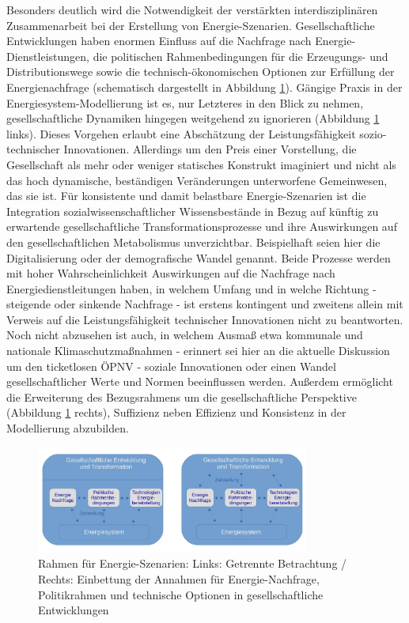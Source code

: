 \documentclass[a4paper,11pt,twoside]{scrartcl}
\begin{document}
Besonders deutlich wird die Notwendigkeit der verstärkten interdisziplinären Zusammenarbeit bei der Erstellung von Energie-Szenarien. Gesellschaftliche Entwicklungen haben enormen Einfluss auf die Nachfrage nach Energie-Dienstleistungen, die politischen Rahmenbedingungen für die Erzeugungs- und Distributionswege sowie die technisch-ökonomischen Optionen zur Erfüllung der Energienachfrage (schematisch dargestellt in Abbildung \ref{fig:szenarien}). Gängige Praxis in der Energiesystem-Modellierung ist es, nur Letzteres in den Blick zu nehmen, gesellschaftliche Dynamiken hingegen weitgehend zu ignorieren (Abbildung \ref{fig:szenarien} links). Dieses Vorgehen erlaubt eine Abschätzung der Leistungsfähigkeit sozio-technischer Innovationen. Allerdings um den Preis einer Vorstellung, die Gesellschaft als mehr oder weniger statisches Konstrukt imaginiert und nicht als das hoch dynamische, beständigen Veränderungen unterworfene Gemeinwesen, das sie ist. Für konsistente und damit belastbare Energie-Szenarien ist die Integration sozialwissenschaftlicher Wissensbestände in Bezug auf künftig zu erwartende gesellschaftliche Transformationsprozesse und ihre Auswirkungen auf den gesellschaftlichen Metabolismus unverzichtbar. Beispielhaft seien hier die Digitalisierung oder der demografische Wandel genannt. Beide Prozesse werden mit hoher Wahrscheinlichkeit Auswirkungen auf die Nachfrage nach Energiedienstleitungen haben, in welchem Umfang und in welche Richtung - steigende oder sinkende Nachfrage - ist erstens kontingent und zweitens allein mit Verweis auf die Leistungsfähigkeit technischer Innovationen nicht zu beantworten. Noch nicht abzusehen ist auch, in welchem Ausmaß etwa kommunale und nationale Klimaschutzmaßnahmen - erinnert sei hier an die aktuelle Diskussion um den ticketlosen ÖPNV - soziale Innovationen oder einen Wandel gesellschaftlicher Werte und Normen beeinflussen werden. Außerdem ermöglicht die Erweiterung des Bezugsrahmens um die gesellschaftliche Perspektive (Abbildung \ref{fig:szenarien} rechts), Suffizienz neben Effizienz und Konsistenz in der Modellierung abzubilden. 

\begin{figure}[!h]
    \centering
    \includegraphics[width=0.8\textwidth]{figures/Szenarien.pdf}
    \caption{Rahmen für Energie-Szenarien: Links: Getrennte Betrachtung / Rechts: Einbettung der Annahmen für Energie-Nachfrage, Politikrahmen und technische Optionen in gesellschaftliche Entwicklungen}
    \label{fig:szenarien}
\end{figure}
\end{document}
